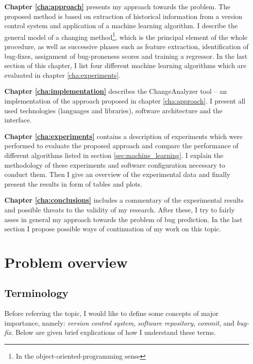 \documentclass{pracamgr}
\begin{document}
\medskip \noindent
\textbf{Chapter \ref{cha:approach}} presents my approach towards the problem. The proposed method is based on extraction of historical information from a version control system and application of a machine learning algorithm. I describe the general model of a changing method\footnote{In the object-oriented-programming sense}, which is the principal element of the whole procedure, as well as successive phases such as feature extraction, identification of bug-fixes, assignment of bug-proneness scores and training a regressor. In the last section of this chapter, I list four different machine learning algorithms which are evaluated in chapter \ref{cha:experiments}.

\medskip \noindent
\textbf{Chapter \ref{cha:implementation}} describes the ChangeAnalyzer tool -- an implementation of the approach proposed in chapter \ref{cha:approach}. I present all used technologies (languages and libraries), software architecture and the interface.

\medskip \noindent
\textbf{Chapter \ref{cha:experiments}} contains a description of experiments which were performed to evaluate the proposed approach and compare the performance of different algorithms listed in section \ref{sec:machine_learning}. I explain the methodology of these experiments and software configuration necessary to conduct them. Then I give an overview of the experimental data and finally present the results in form of tables and plots.

\medskip \noindent
\textbf{Chapter \ref{cha:conclusions}} includes a commentary of the experimental results and possible threats to the validity of my research. After these, I try to fairly asses in general my approach towards the problem of bug prediction. In the last section I propose possible ways of continuation of my work on this topic.

\chapter{Problem overview}
\label{cha:overview}

\section{Terminology}
\label{sec:terminology}
Before referring the topic, I would like to define some concepts of major importance, namely: \textit{version control system}, \textit{software repository}, \textit{commit}, and \textit{bug-fix}. Below are given brief explications of how I understand these terms.
\end{document}
